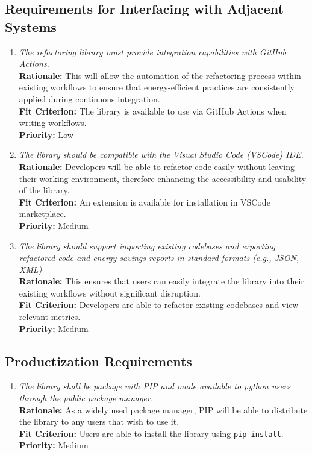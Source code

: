 \documentclass[12pt]{article}
\begin{document}
\subsection{Requirements for Interfacing with Adjacent Systems}
\begin{enumerate}[label=OER-IAS \arabic*., wide=0pt, leftmargin=*]
	\item \emph{The refactoring library must provide integration capabilities with GitHub Actions.}\\[2mm]
    {\bf Rationale:} This will allow the automation of the refactoring process within existing workflows to ensure that energy-efficient practices are consistently applied during continuous integration.\\
    {\bf Fit Criterion:} The library is available to use via GitHub Actions when writing workflows.\\
    {\bf Priority:} Low
  \item \emph{The library should be compatible with the Visual Studio Code (VSCode) IDE.}\\[2mm]
    {\bf Rationale:} Developers will be able to refactor code easily without leaving their working environment, therefore enhancing the accessibility and usability of the library.\\
    {\bf Fit Criterion:} An extension is available for installation in VSCode marketplace.\\
    {\bf Priority:} Medium
  \item \emph{The library should support importing existing codebases and exporting refactored code and energy savings reports in standard formats (e.g., JSON, XML)}\\[2mm]
    {\bf Rationale:} This ensures that users can easily integrate the library into their existing workflows without significant disruption.\\
    {\bf Fit Criterion:} Developers are able to refactor existing codebases and view relevant metrics.\\
    {\bf Priority:} Medium
\end{enumerate}

\subsection{Productization Requirements}
\begin{enumerate}[label=OER-PR \arabic*., wide=0pt, leftmargin=*]
	\item \emph{The library shall be package with PIP and made available to python users through the public package manager.}\\[2mm]
    {\bf Rationale:} As a widely used package manager, PIP will be able to distribute the library to any users that wish to use it.\\
    {\bf Fit Criterion:} Users are able to install the library using \texttt{pip install}. \\
    {\bf Priority:} Medium
\end{enumerate}
\end{document}
